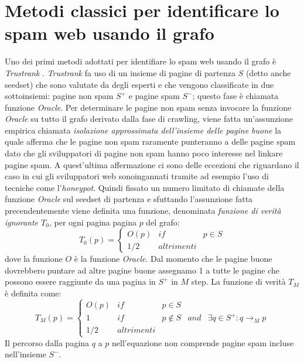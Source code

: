\section{Metodi classici per identificare lo spam web usando il grafo}
Uno dei primi metodi adottati per identifiare lo spam web usando il grafo è \textit{Trustrank} \cite{Gyongyi:2004:CWS:1316689.1316740}. \textit{Trustrank} fa uso di un insieme di pagine di partenza \(S\) (detto anche seedset) che sono valutate da degli esperti e che vengono classificate in due sottoinsiemi: pagine non spam \(S^+\) e pagine spam \(S^-\); questo fase è chiamata funzione \textit{Oracle}. Per determinare le pagine non spam senza invocare la funzione \textit{Oracle} su tutto il grafo derivato dalla fase di crawling, viene fatta un'assunzione empirica chiamata \textit{isolazione approssimata dell'insieme delle pagine buone} la quale afferma che le pagine non spam raramente punteranno a delle pagine spam dato che gli sviluppatori di pagine non spam hanno poco interesse nel linkare pagine spam.  A quest'ultima affermazione ci sono delle eccezioni che riguardano il caso in cui gli sviluppatori web sonoingannati tramite ad esempio l'uso di tecniche come l'\textit{honeypot}. Quindi fissato un numero 
limitato di chiamate della funzione \textit{Oracle} sul seedset di partenza e sfuttando l'assunzione fatta precendentemente viene definita una funzione, denominata \textit{funzione di verità ignorante \(T_0\)}, per ogni pagina pagina \(p\) del grafo:
\begin{equation}
T_0(p)=\left\{
\begin{array}{ccc}
O(p) & if & p\in S \\
1/2 & altrimenti
\end{array}
\right .
\end{equation}
dove la funzione \(O\) è la funzione \textit{Oracle}. Dal momento che le pagine buone dovrebbero puntare ad altre pagine buone assegnamo 1 a tutte le pagine che possono essere raggiunte da una pagina in \(S^+\) in \(M\) step. La funzione di verità \(T_M\) è definita come:
\begin{equation}
T_M(p)=\left\{
\begin{array}{ccccc}
O(p) & if & p\in S \\
1 & if & p \not\in S & and & \exists q\in S^+:q\rightarrow_M p \\
1/2 & altrimenti
\end{array}
\right .
\end{equation}
Il percorso  dalla pagina \(q\) a \(p\) nell'equazione non comprende pagine spam incluse nell'insieme \(S^-\).

